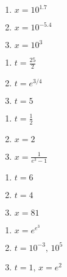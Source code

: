 \begin{multicols}{3}
\begin{enumerate}
\setcounter{enumi}{\value{HW}}

\item $x = 10^{1.7}$
\item $x = 10^{-5.4}$
\item $x = 10^{3}$

\setcounter{HW}{\value{enumi}}
\end{enumerate}
\end{multicols}

\begin{multicols}{3}
\begin{enumerate}
\setcounter{enumi}{\value{HW}}

\item $t=\frac{25}{2}$
\item $t=e^{3/4}$
\item $t = 5$

\setcounter{HW}{\value{enumi}}
\end{enumerate}
\end{multicols}

\begin{multicols}{3}
\begin{enumerate}
\setcounter{enumi}{\value{HW}}

\item $t = \frac{1}{2}$
\item $x = 2$
\item $x = \frac{1}{e^3-1}$

\setcounter{HW}{\value{enumi}}
\end{enumerate}
\end{multicols}

\begin{multicols}{3}
\begin{enumerate}
\setcounter{enumi}{\value{HW}}

\item $t=6$
\item $t=4$
\item $x = 81$

\setcounter{HW}{\value{enumi}}
\end{enumerate}
\end{multicols}

\begin{multicols}{3}
\begin{enumerate}
\setcounter{enumi}{\value{HW}}

\item $x = e^{e^3}$
\item $t=10^{-3}, \, 10^{5}$
\item $t = 1, \, x = e^{2}$

\setcounter{HW}{\value{enumi}}
\end{enumerate}
\end{multicols}

